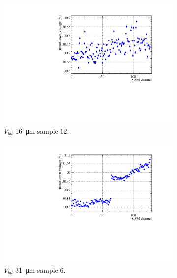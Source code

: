 \begin{figure}[htbp]
  \centering
  \begin{subfigure}{0.48\textwidth}
    \includegraphics[width=\textwidth]{gfx/plots/WA/16/Vbd16.pdf}
    \caption{$V_{bd}$ \SI{16}{\micro m} sample $12$.}
    \label{fig:}
  \end{subfigure}
  \hfill
  \begin{subfigure}{0.48\textwidth}
    \includegraphics[width=\textwidth]{gfx/plots/WA/31/Vbd31.pdf}
    \caption{$V_{bd}$ \SI{31}{\micro m} sample $6$.}
    \label{fig:}
  \end{subfigure}
  \begin{subfigure}{0.48\textwidth}

\end{subfigure}
\end{figure}
